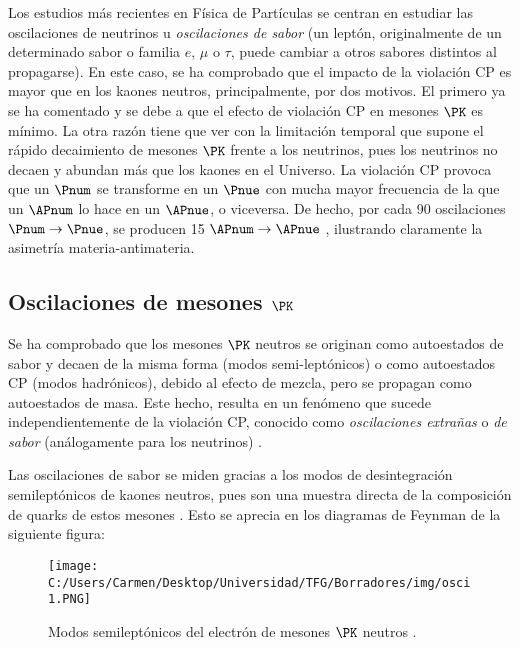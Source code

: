 Los estudios más recientes en Física de Partículas se centran en estudiar las oscilaciones de neutrinos u \textit{oscilaciones de sabor} (un leptón, originalmente de un determinado sabor o familia $e$, $\mu$ o $\tau$, puede cambiar a otros sabores distintos al propagarse). En este caso, se ha comprobado que el impacto de la violación CP es mayor que en los kaones neutros, principalmente, por dos motivos. El primero ya se ha comentado y se debe a que el efecto de violación CP en mesones $\PK$ es mínimo. La otra razón tiene que ver con la limitación temporal que supone el rápido decaimiento de mesones $\PK$ frente a los neutrinos, pues los neutrinos no decaen y abundan más que los kaones en el Universo. La violación CP provoca que un $\Pnum$ se transforme en un $\Pnue$ con mucha mayor frecuencia de la que un $\APnum$ lo hace en un $\APnue$, o viceversa. De hecho, por cada 90 oscilaciones $\Pnum\rightarrow\Pnue$, se producen 15 $\APnum\rightarrow\APnue$ \cite{T2K}, ilustrando claramente la asimetría materia-antimateria.

\subsection{Oscilaciones de mesones $\PK$}\label{sec:kaon_oscillations}
Se ha comprobado que los mesones $\PK$ neutros se originan como autoestados de sabor y decaen de la misma forma (modos semi-leptónicos) o como autoestados CP (modos hadrónicos), debido al efecto de mezcla, pero se propagan como autoestados de masa. Este hecho, resulta en un fenómeno que sucede independientemente de la violación CP, conocido como \textit{oscilaciones extrañas} o \textit{de sabor} (análogamente para los neutrinos) \cite{Thomson}.

Las oscilaciones de sabor se miden gracias a los modos de desintegración semileptónicos de kaones neutros, pues son una muestra directa de la composición de quarks de estos mesones \cite{Thomson}. Esto se aprecia en los diagramas de Feynman de la siguiente figura:
\begin{figure}[!ht]
	\centering
	\texttt{[image: C:/Users/Carmen/Desktop/Universidad/TFG/Borradores/img/osci1.PNG]}
	\caption[Modos semileptónicos del electrón de mesones $\PK$ neutros]
	{Modos semileptónicos del electrón de mesones $\PK$ neutros \cite{Thomson}.}
	\label{fig:oscillation1}
\end{figure}

